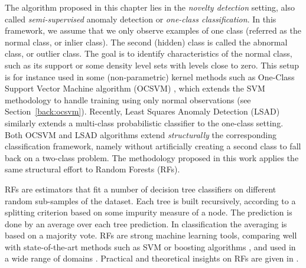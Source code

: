 The algorithm proposed in this chapter lies in the \emph{novelty detection}
setting, also called \emph{semi-supervised} anomaly detection or
\emph{one-class classification}. In this framework, we assume that we only observe examples of one
class (referred as the normal class, or inlier class). The second (hidden) class is called the abnormal class, or outlier class. 
The goal is to identify characteristics of the normal class, such as its
support or some density level sets with levels close to zero.
%
This setup is for instance used in some (non-parametric) kernel methods such as
One-Class Support Vector Machine algorithm (OCSVM) \citep{Scholkopf2001}, which extends
the SVM methodology \citep{Cortes1995,Shawe2004} to handle training using only normal observations (see Section~\ref{back:ocsvm}).
Recently, Least Squares Anomaly Detection (LSAD) \citep{Quinn2014} similarly extends a multi-class probabilistic classifier \citep{Sugiyama2010} to the one-class setting.
%
Both OCSVM and LSAD algorithms extend \emph{structurally} the corresponding classification
framework, namely without artificially creating a second class to
fall back on a two-class problem. %
The methodology proposed in this work applies the same structural effort to
Random Forests (RFs).


RFs \citep{Breiman2001} are estimators that fit a number of decision tree
classifiers on different random sub-samples of the dataset.
Each tree is built recursively, according to a splitting criterion based on
some impurity measure of a node.
The prediction is done by an average over each tree prediction.
In classification the averaging is based on a majority vote. %
RFs are strong machine learning tools, comparing well with state-of-the-art
methods such as SVM or boosting algorithms \citep{Freund1996}, and used in
a wide range of domains \citep{Svetnik2003, Diaz2006, Genuer2010}. Practical and
theoretical insights on RFs are given in \cite{Genuer2008, Biau2008, Louppe2014, Biau2016}.

